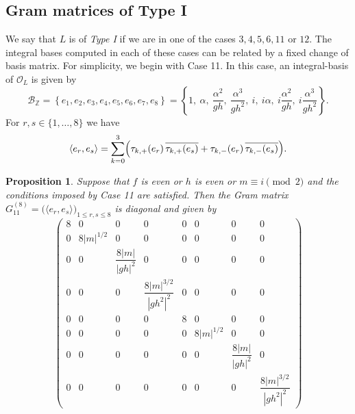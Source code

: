 \documentclass{amsart}
\newcommand{\Z}{\mathbb{Z}}
\newcommand{\cO}{\mathcal{O}}
\theoremstyle{plain}
\newtheorem{proposition}[theorem]{Proposition}
\theoremstyle{definition}
\theoremstyle{remark}
\numberwithin{equation}{section}
\begin{document}
\subsection{Gram matrices of Type I}
\par We say that $L$ is of \emph{Type I} if we are in one of the cases $3,4,5,6,11$ or $12$. The integral bases computed in each of these cases can be related by a fixed change of basis matrix. For simplicity, we begin with Case 11. In this case, an integral-basis of $\cO_L$ is given by
\[
\mathcal B_{\Z}
=
\left\{
e_1,e_2,e_3,e_4,e_5,e_6,e_7,e_8
\right\}
=
\left\{
1,\ \alpha,\ \frac{\alpha^2}{gh},\ \frac{\alpha^3}{gh^2},
\ i,\ i\alpha,\ i\frac{\alpha^2}{gh},\ i\frac{\alpha^3}{gh^2}
\right\}.
\]
For $r,s\in\{1,\dots,8\}$ we have
\[
\langle e_r,e_s\rangle
=
\sum_{k=0}^3
\Bigl(
\tau_{k,+}(e_r)\,\overline{\tau_{k,+}(e_s)}
+
\tau_{k,-}(e_r)\,\overline{\tau_{k,-}(e_s)}
\Bigr).
\]
\begin{proposition}
Suppose that $f$ is even or $h$ is even or $m \equiv i \pmod{2}$ and the conditions imposed by Case 11 are satisfied. Then the Gram matrix $G^{(8)}_{11}
=
\bigl(\langle e_r,e_s\rangle\bigr)_{1\le r,s\le 8}$ is diagonal and given by
\[
\begin{pmatrix}
8 & 0 & 0 & 0 & 0 & 0 & 0 & 0 \\
0 & 8|m|^{1/2} & 0 & 0 & 0 & 0 & 0 & 0 \\
0 & 0 & \dfrac{8|m|}{|gh|^{2}} & 0 & 0 & 0 & 0 & 0 \\
0 & 0 & 0 & \dfrac{8|m|^{3/2}}{|gh^2|^{2}} & 0 & 0 & 0 & 0 \\
0 & 0 & 0 & 0 & 8 & 0 & 0 & 0 \\
0 & 0 & 0 & 0 & 0 & 8|m|^{1/2} & 0 & 0 \\
0 & 0 & 0 & 0 & 0 & 0 & \dfrac{8|m|}{|gh|^{2}} & 0 \\
0 & 0 & 0 & 0 & 0 & 0 & 0 & \dfrac{8|m|^{3/2}}{|gh^2|^{2}}
\end{pmatrix}
\]

\end{proposition}
\end{document}

